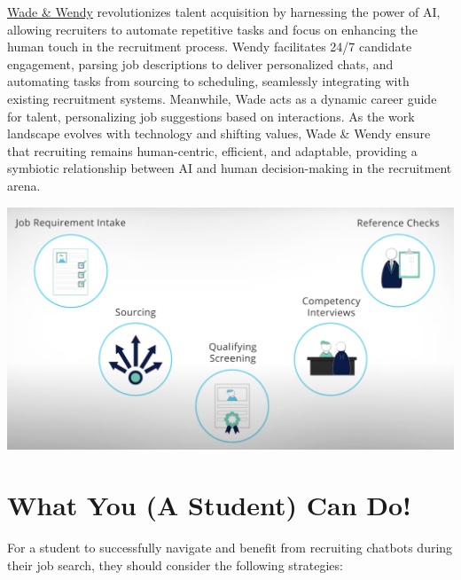 \documentclass[
]{book}
\begin{document}
\href{https://wadeandwendy.ai/}{Wade \& Wendy} revolutionizes talent acquisition by harnessing the power of AI, allowing recruiters to automate repetitive tasks and focus on enhancing the human touch in the recruitment process. Wendy facilitates 24/7 candidate engagement, parsing job descriptions to deliver personalized chats, and automating tasks from sourcing to scheduling, seamlessly integrating with existing recruitment systems. Meanwhile, Wade acts as a dynamic career guide for talent, personalizing job suggestions based on interactions. As the work landscape evolves with technology and shifting values, Wade \& Wendy ensure that recruiting remains human-centric, efficient, and adaptable, providing a symbiotic relationship between AI and human decision-making in the recruitment arena.

\includegraphics[width=5.45833in,height=\textheight]{wadewendy pic.png}

\hypertarget{what-you-a-student-can-do}{%
\section{What You (A Student) Can Do!}\label{what-you-a-student-can-do}}

For a student to successfully navigate and benefit from recruiting chatbots during their job search, they should consider the following strategies:
\end{document}
